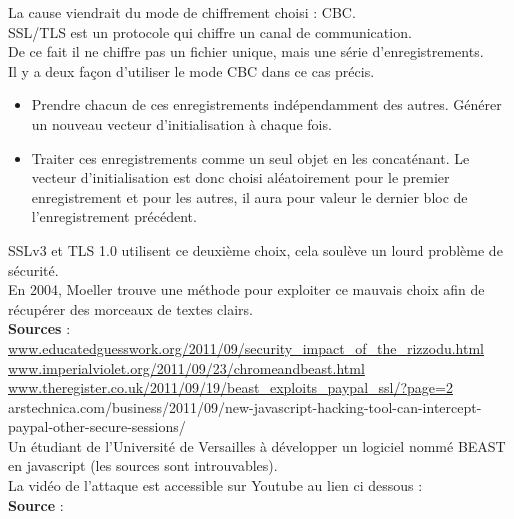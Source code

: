 \documentclass{article}
\begin{document}
	La cause viendrait du mode de chiffrement choisi : CBC.\\

	SSL/TLS est un protocole qui chiffre un canal de communication.\\
	De ce fait il ne chiffre pas un fichier unique, mais une série
	d'enregistrements.\\
	Il y a deux façon d'utiliser le mode CBC dans ce cas précis.
	\begin{itemize}
	\item Prendre chacun de ces enregistrements indépendamment des autres.
	Générer un nouveau vecteur d'initialisation à chaque fois.
	\item Traiter ces enregistrements comme un seul objet en les
	concaténant. Le vecteur d'initialisation est donc choisi aléatoirement
	pour le premier enregistrement et pour les autres, il aura pour
	valeur le dernier bloc de l'enregistrement précédent.
	\end{itemize}
	
	SSLv3 et TLS 1.0 utilisent ce deuxième choix, cela soulève 
	un lourd problème de sécurité.\\
	
	En 2004, Moeller trouve une méthode pour exploiter ce mauvais choix
	afin de récupérer des morceaux de textes clairs.\\
	
	
	\textbf{Sources} : \\
	\href{http://www.educatedguesswork.org/2011/09/security_impact_of_the_rizzodu.html}
	{www.educatedguesswork.org/2011/09/security\_impact\_of\_the\_rizzodu.html}	\\
	\href{https://www.imperialviolet.org/2011/09/23/chromeandbeast.html}
	{www.imperialviolet.org/2011/09/23/chromeandbeast.html}\\
	\href{http://www.theregister.co.uk/2011/09/19/beast_exploits_paypal_ssl/?page=2}
	{www.theregister.co.uk/2011/09/19/beast\_exploits\_paypal\_ssl/?page=2}
	\href{http://arstechnica.com/business/2011/09/new-javascript-hacking-tool-can-intercept-paypal-other-secure-sessions/}\\
	{arstechnica.com/business/2011/09/new-javascript-hacking-tool-can-intercept-paypal-other-secure-sessions/}\\
	
	Un étudiant de l'Université de Versailles à développer un logiciel
	nommé BEAST en javascript (les sources sont introuvables).\\
	
	La vidéo de l'attaque est accessible sur Youtube au lien ci dessous :\\
	\textbf{Source} : \\
	
\end{document}
